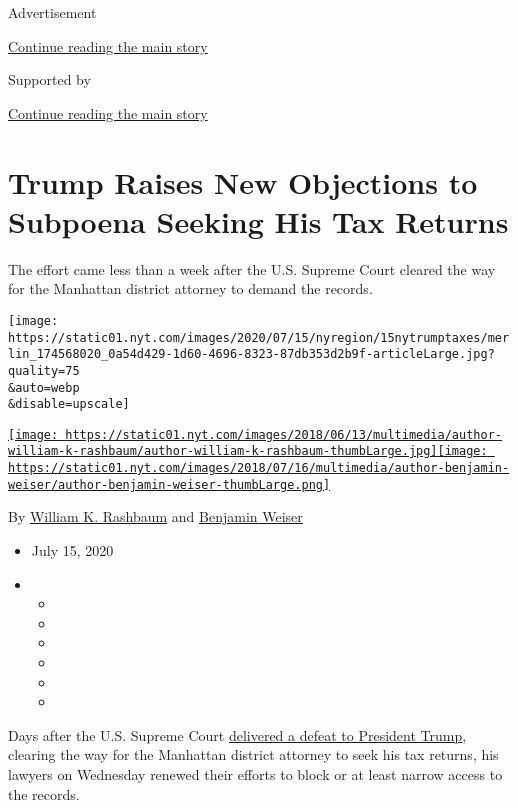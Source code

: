 Advertisement

\protect\hyperlink{after-top}{Continue reading the main story}

Supported by

\protect\hyperlink{after-sponsor}{Continue reading the main story}

\hypertarget{trump-raises-new-objections-to-subpoena-seeking-his-tax-returns}{%
\section{Trump Raises New Objections to Subpoena Seeking His Tax
Returns}\label{trump-raises-new-objections-to-subpoena-seeking-his-tax-returns}}

The effort came less than a week after the U.S. Supreme Court cleared
the way for the Manhattan district attorney to demand the records.

\texttt{[image: https://static01.nyt.com/images/2020/07/15/nyregion/15nytrumptaxes/merlin\_174568020\_0a54d429-1d60-4696-8323-87db353d2b9f-articleLarge.jpg?quality=75\\\&auto=webp\\\&disable=upscale]}

\href{https://www.nytimes.com/by/william-k-rashbaum}{\texttt{[image: https://static01.nyt.com/images/2018/06/13/multimedia/author-william-k-rashbaum/author-william-k-rashbaum-thumbLarge.jpg]}}\href{https://www.nytimes.com/by/benjamin-weiser}{\texttt{[image: https://static01.nyt.com/images/2018/07/16/multimedia/author-benjamin-weiser/author-benjamin-weiser-thumbLarge.png]}}

By \href{https://www.nytimes.com/by/william-k-rashbaum}{William K.
Rashbaum} and \href{https://www.nytimes.com/by/benjamin-weiser}{Benjamin
Weiser}

\begin{itemize}
\item
  July 15, 2020
\item
  \begin{itemize}
  \item
  \item
  \item
  \item
  \item
  \item
  \end{itemize}
\end{itemize}

Days after the U.S. Supreme Court
\href{https://www.nytimes.com/2020/07/09/us/trump-taxes-supreme-court.html}{delivered
a defeat to President Trump}, clearing the way for the Manhattan
district attorney to seek his tax returns, his lawyers on Wednesday
renewed their efforts to block or at least narrow access to the records.


